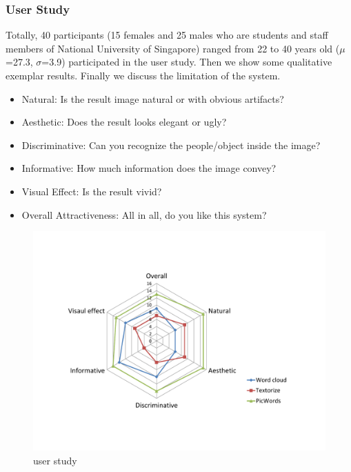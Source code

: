 \documentclass[letter]{sig-alternate}
\begin{document}
\subsubsection{User Study}

Totally, 40 participants (15 females and 25 males who are students and staff members of National University of Singapore) ranged from 22 to 40 years old ($\mu$=27.3, $\sigma$=3.9) participated in the user study. Then we show some qualitative exemplar results. Finally we discuss the limitation of the system. 


\begin{itemize}
    \item Natural: Is the result image natural or with obvious artifacts? 
    \item Aesthetic: Does the result looks elegant or ugly? 
    \item Discriminative: Can you recognize the people/object inside the image?
    \item Informative: How much information does the image convey?
    \item Visual Effect: Is the result vivid? 
    \item Overall Attractiveness: All in all, do you like this system?
\end{itemize}

\begin{figure}[t]
\begin{center}
\includegraphics[scale=0.35]{figure/baseline2.pdf}
\caption{\small{user study}}
\label{fig:firstfig}
\end{center}
\end{figure}
\end{document}
